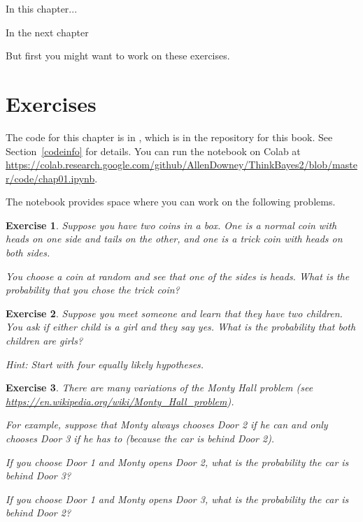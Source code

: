 \documentclass[12pt]{book}
\theoremstyle{exercise}
\newtheorem{exercise}{Exercise}[chapter]
\begin{document}
In this chapter...

In the next chapter

But first you might want to work on these exercises.


\section{Exercises}

The code for this chapter is in , which is in the repository for this book.  See Section~\ref{codeinfo} for details.
You can run the notebook on Colab at \url{https://colab.research.google.com/github/AllenDowney/ThinkBayes2/blob/master/code/chap01.ipynb}.

The notebook provides space where you can work on the following problems.

\begin{exercise}

Suppose you have two coins in a box.
One is a normal coin with heads on one side and tails on the other, and one is a trick coin with heads on both sides.

You choose a coin at random and see that one of the sides is heads.
What is the probability that you chose the trick coin?

\end{exercise}


\begin{exercise}

Suppose you meet someone and learn that they have two children.
You ask if either child is a girl and they say yes.
What is the probability that both children are girls?

Hint: Start with four equally likely hypotheses.

\end{exercise}


\begin{exercise}

There are many variations of the Monty Hall problem (see \url{https://en.wikipedia.org/wiki/Monty_Hall_problem}).  

For example, suppose that Monty always chooses Door 2 if he can and
only chooses Door 3 if he has to (because the car is behind Door 2).

If you choose Door 1 and Monty opens Door 2, what is the probability the car is behind Door 3?

If you choose Door 1 and Monty opens Door 3, what is the probability the car is behind Door 2?

\end{exercise}
\end{document}
